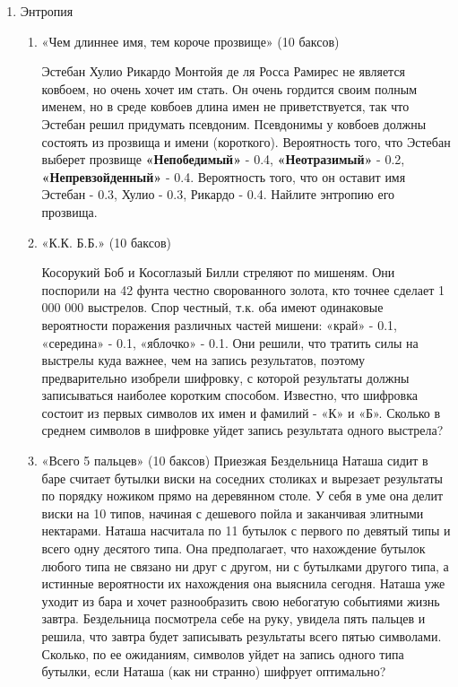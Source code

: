 \documentclass[11pt, a4paper]{article}
\theoremstyle{definition}
\begin{document}
\begin{enumerate}
    \item Энтропия
\begin{enumerate}
    \item  «Чем длиннее имя, тем короче прозвище» (10 баксов)
    
    Эстебан Хулио Рикардо Монтойя де ля Росса Рамирес не является ковбоем, но очень хочет им стать. Он очень гордится своим полным именем, но в среде ковбоев длина имен не приветствуется, так что Эстебан решил придумать псевдоним. Псевдонимы у ковбоев должны состоять из прозвища и имени (короткого). Вероятность того, что Эстебан выберет прозвище \textbf{«Непобедимый»} - 0.4, \textbf{«Неотразимый»} - 0.2, \textbf{«Непревзойденный»} - 0.4. Вероятность того, что он оставит имя Эстебан - 0.3, Хулио - 0.3, Рикардо - 0.4. Найлите энтропию его прозвища.
    \item «К.К. Б.Б.» (10 баксов)
    
    Косорукий Боб и Косоглазый Билли стреляют по мишеням. Они поспорили на 42 фунта честно сворованного золота, кто точнее сделает 1 000 000 выстрелов. Спор честный, т.к. оба имеют одинаковые вероятности поражения различных частей мишени: «край» - 0.1, «середина» - 0.1, «яблочко» - 0.1. Они решили, что тратить силы на выстрелы куда важнее, чем на запись результатов, поэтому предварительно изобрели шифровку, с которой результаты должны записываться наиболее коротким способом. Известно, что шифровка состоит из первых символов их имен и фамилий - «К» и «Б». Сколько в среднем символов в шифровке уйдет запись результата одного выстрела?
    
    \newpage
    
    \item «Всего 5 пальцев» (10 баксов)
    Приезжая Бездельница Наташа сидит в баре считает бутылки виски на соседних столиках и вырезает результаты по порядку ножиком прямо на деревянном столе. У себя в уме она делит виски на 10 типов, начиная с дешевого пойла и заканчивая элитными нектарами. Наташа насчитала по 11 бутылок с первого по девятый типы и всего одну десятого типа. Она предполагает, что нахождение бутылок любого типа не связано ни друг с другом, ни с бутылками другого типа, а истинные вероятности их нахождения она выяснила сегодня. Наташа уже уходит из бара и хочет разнообразить свою небогатую событиями жизнь завтра. Бездельница посмотрела себе на руку, увидела пять пальцев и решила, что завтра будет записывать результаты всего пятью символами. Сколько, по ее ожиданиям, символов уйдет на запись одного типа бутылки, если Наташа (как ни странно) шифрует оптимально? 
    

\end{enumerate}
\end{enumerate}
\end{document}
